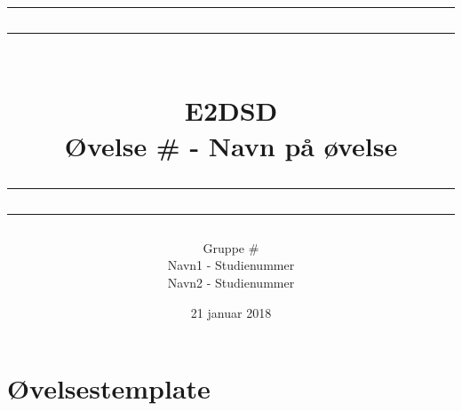 \documentclass[12pt,a4paper]{article}
\newcommand\mymaketitle[1]{
   \rule{\textwidth}{1.6pt}\vspace*{-\baselineskip}\vspace*{2pt}
   \rule{\textwidth}{0.4pt}
   \\  
   \huge \bf #1\\
   \vspace{-8pt}
   \rule{\textwidth}{0.4pt}\vspace*{-\baselineskip}\vspace{3.2pt}
   \rule{\textwidth}{1.6pt}
}
\begin{document}
\title{
	\mymaketitle{E2DSD\\Øvelse \# - Navn på øvelse}
}
\author{
	Gruppe \#\\
	Navn1 - Studienummer\\
	Navn2 - Studienummer
}
\date{21 januar 2018}

\maketitle



\section{Øvelsestemplate}


\end{document}
